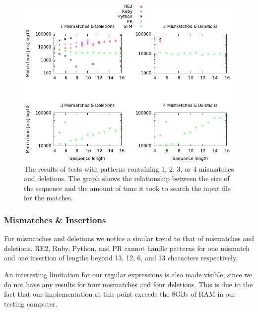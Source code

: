 \documentclass[12pt]{article}
\theoremstyle{definition}
\begin{document}
\begin{figure}[H]
	\begin{center}
		\includegraphics[scale=0.55]{graphs/mismatches_deletions.png}	
	\end{center}
	\caption{The results of tests with patterns containing 1, 2, 3, or 4 mismatches and deletions. The graph shows the relationship between the size of the sequence and the amount of time it took to search the input file for the matches.}
	\label{graph:mismatches:deletions}
\end{figure}

\subsubsection{Mismatches \& Insertions}

For mismatches and deletions we notice a similar trend to that of mismatches and deletions. RE2, Ruby, Python, and PR cannot handle patterns for one mismatch and one insertion of lengths beyond 13, 12, 6, and 13 characters respectively.

An interesting limitation for our regular expressions is also made visible, since we do not have any results for four mismatches and four deletions. This is due to the fact that our implementation at this point exceeds the 8GBs of RAM in our testing computer. 
\end{document}
